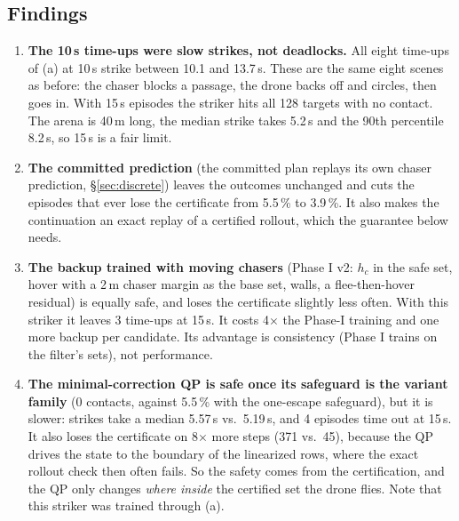 \documentclass[11pt]{article}
\begin{document}
\subsection{Findings}
\begin{enumerate}
\item \textbf{The 10\,s time-ups were slow strikes, not deadlocks.} All eight time-ups of (a) at 10\,s strike between 10.1 and 13.7\,s.
These are the same eight scenes as before: the chaser blocks a passage, the drone backs off and circles, then goes in.
With 15\,s episodes the striker hits all 128 targets with no contact. The arena is 40\,m long, the median strike takes 5.2\,s and the 90th percentile 8.2\,s, so 15\,s is a fair limit.
\item \textbf{The committed prediction} (the committed plan replays its own chaser prediction, \S\ref{sec:discrete}) leaves the outcomes unchanged and cuts the episodes that ever lose the certificate from 5.5\,\% to 3.9\,\%.
It also makes the continuation an exact replay of a certified rollout, which the guarantee below needs.
\item \textbf{The backup trained with moving chasers} (Phase I v2: $h_c$ in the safe set, hover with a 2\,m chaser margin as the base set, walls, a flee-then-hover residual) is equally safe, and loses the certificate slightly less often.
With this striker it leaves 3 time-ups at 15\,s. It costs 4$\times$ the Phase-I training and one more backup per candidate.
Its advantage is consistency (Phase I trains on the filter's sets), not performance.
\item \textbf{The minimal-correction QP is safe once its safeguard is the variant family} (0 contacts, against 5.5\,\% with the one-escape safeguard), but it is slower: strikes take a median 5.57\,s vs.\ 5.19\,s, and 4 episodes time out at 15\,s.
It also loses the certificate on 8$\times$ more steps (371 vs.\ 45), because the QP drives the state to the boundary of the linearized rows, where the exact rollout check then often fails.
So the safety comes from the certification, and the QP only changes \emph{where inside} the certified set the drone flies. Note that this striker was trained through (a).
\end{enumerate}
\end{document}
